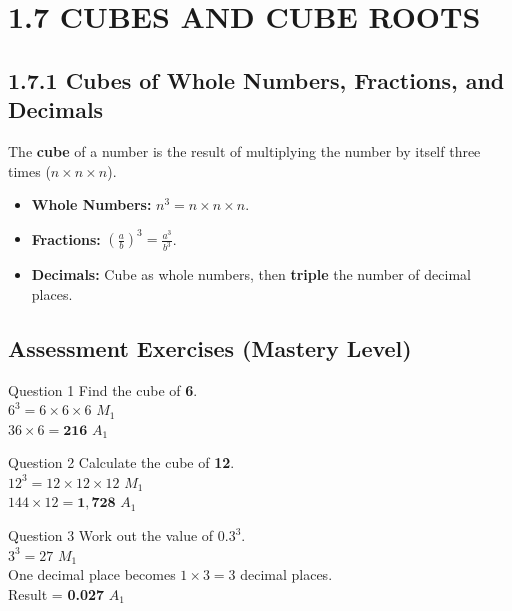 \documentclass[12pt, a4paper, oneside]{article}
\begin{document}
\section*{1.7 CUBES AND CUBE ROOTS}

\subsection*{1.7.1 Cubes of Whole Numbers, Fractions, and Decimals}

\begin{tcolorbox}[colback=lightgrey, colframe=primaryblue, title=\textbf{Concept Summary}, arc=5pt]
    The \textbf{cube} of a number is the result of multiplying the number by itself three times ($n \times n \times n$).
    \begin{itemize}
        \item \textbf{Whole Numbers:} $n^3 = n \times n \times n$.
        \item \textbf{Fractions:} $(\frac{a}{b})^3 = \frac{a^3}{b^3}$.
        \item \textbf{Decimals:} Cube as whole numbers, then \textbf{triple} the number of decimal places.
    \end{itemize}
\end{tcolorbox}

\subsection*{Assessment Exercises (Mastery Level)}

\begin{solvingbox}{Question 1}
Find the cube of \textbf{6}. \\
$6^3 = 6 \times 6 \times 6$ \hfill $M_1$ \\
$36 \times 6 = \mathbf{216}$ \hfill $A_1$
\end{solvingbox}

\begin{solvingbox}{Question 2}
Calculate the cube of \textbf{12}. \\
$12^3 = 12 \times 12 \times 12$ \hfill $M_1$ \\
$144 \times 12 = \mathbf{1,728}$ \hfill $A_1$
\end{solvingbox}

\begin{solvingbox}{Question 3}
Work out the value of \textbf{$0.3^3$}. \\
$3^3 = 27$ \hfill $M_1$ \\
One decimal place becomes $1 \times 3 = 3$ decimal places. \\
Result = \textbf{0.027} \hfill $A_1$
\end{solvingbox}
\end{document}
